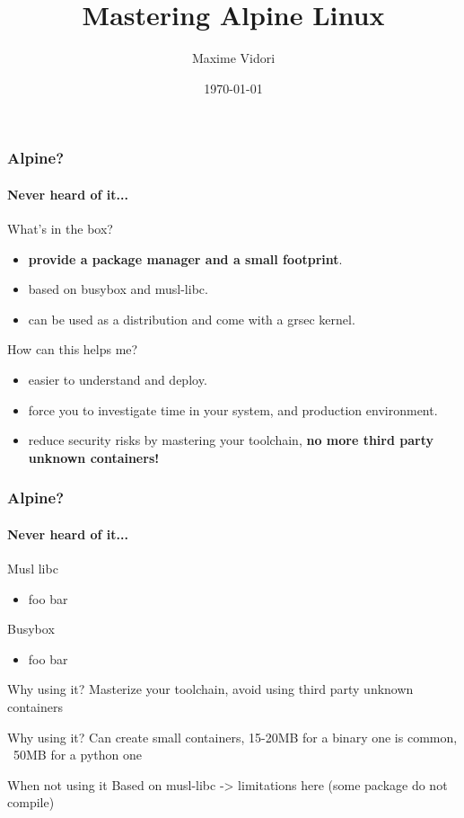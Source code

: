 \documentclass{beamer}
\title{Mastering Alpine Linux}
\date{\today}
\author{Maxime Vidori}
\begin{document}
\begin{frame}
  \titlepage
\end{frame}


\begin{frame}
  \frametitle{Alpine?}
  \framesubtitle{Never heard of it...}
  What's in the box?
  \begin{itemize}
    \item \textbf{provide a package manager and a small footprint}.
    \item based on busybox and musl-libc.
    \item can be used as a distribution and come with a grsec kernel.
  \end{itemize}
  How can this helps me?
  \begin{itemize}
    \item easier to understand and deploy.
    \item force you to investigate time in your system, and production
      environment.
    \item reduce security risks by mastering your toolchain, \textbf{no more third party unknown containers!}
  \end{itemize}
\end{frame}

\begin{frame}
  \frametitle{Alpine?}
  \framesubtitle{Never heard of it...}
  Musl libc
  \begin{itemize}
    \item foo bar
  \end{itemize}
  Busybox
  \begin{itemize}
    \item foo bar
  \end{itemize}
\end{frame}

\begin{frame}{Why using it?}
  Masterize your toolchain, avoid using third party unknown containers
\end{frame}

\begin{frame}{Why using it?}
  Can create small containers, 15-20MB for a binary one is common,
    ~50MB for a python one
\end{frame}

\begin{frame}{When not using it}
  Based on musl-libc -> limitations here (some package do not compile)
\end{frame}
\end{document}
